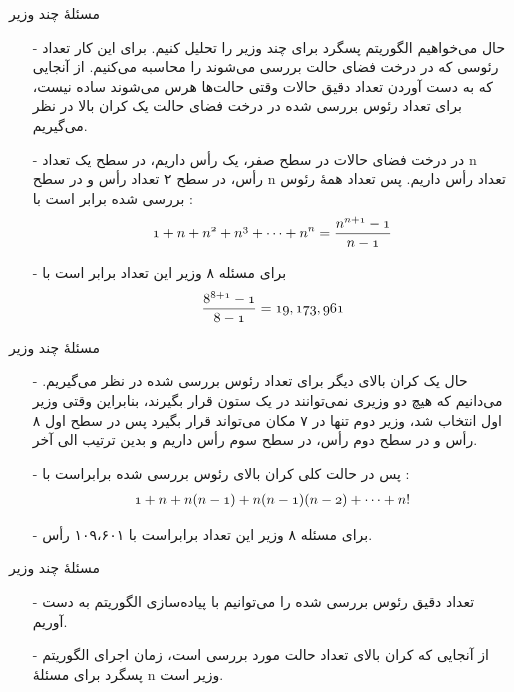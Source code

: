 \begin{frame}{مسئلهٔ چند وزیر}
\begin{itemize}\itemr
\item[-]
حال می‌خواهیم الگوریتم پسگرد برای چند وزیر را تحلیل کنیم.
برای این کار تعداد رئوسی که در درخت فضای حالت بررسی می‌شوند را محاسبه می‌کنیم. از آنجایی که به دست آوردن تعداد دقیق حالات  وقتی حالت‌ها هرس می‌شوند ساده نیست، برای تعداد رئوس بررسی شده در درخت فضای حالت یک کران بالا در نظر می‌گیریم.
\item[-]
در درخت فضای حالات در سطح صفر، یک رأس داریم، در سطح یک تعداد n رأس، در سطح ۲ تعداد
رأس و در سطح n تعداد
رأس داریم. پس تعداد همهٔ رئوس بررسی شده برابر است با :
\begin{align*}
\mathnormal{1 + n + n^2 + n^3 + \cdots + n^n = \frac{n^{n+1} - 1}{n-1}}
\end{align*}
\item[-]
برای مسئله ۸ وزیر این تعداد برابر است با
\begin{align*}
\mathnormal{\frac{8^{8+1}-1}{8-1} = 19,173,961}
\end{align*}
\end{itemize}
\end{frame}


\begin{frame}{مسئلهٔ چند وزیر}
\begin{itemize}\itemr
\item[-]
حال یک کران بالای دیگر برای تعداد رئوس بررسی شده در نظر می‌گیریم. می‌دانیم که هیچ دو وزیری نمی‌توانند در یک ستون قرار بگیرند، بنابراین وقتی وزیر اول انتخاب شد، وزیر دوم تنها در ۷ مکان می‌تواند قرار بگیرد پس در سطح اول ۸ رأس و در سطح دوم
رأس، در سطح سوم
رأس داریم و بدین ترتیب الی آخر.
\item[-]
پس در حالت کلی کران بالای رئوس بررسی شده برابراست با :
\begin{align*}
\mathnormal{1 + n + n(n-1) + n(n-1)(n-2) + \cdots + n!}
\end{align*}
\item[-]
برای مسئله ۸ وزیر این تعداد برابراست با
۱۰۹،۶۰۱
رأس.
\end{itemize}
\end{frame}


\begin{frame}{مسئلهٔ چند وزیر}
\begin{itemize}\itemr
\item[-]
تعداد دقیق رئوس بررسی شده را می‌توانیم با پیاده‌سازی الگوریتم به دست آوریم.
\item[-]
از آنجایی که کران بالای تعداد حالت مورد بررسی
است، زمان اجرای الگوریتم پسگرد برای مسئلهٔ n وزیر
است.
\end{itemize}
\end{frame}